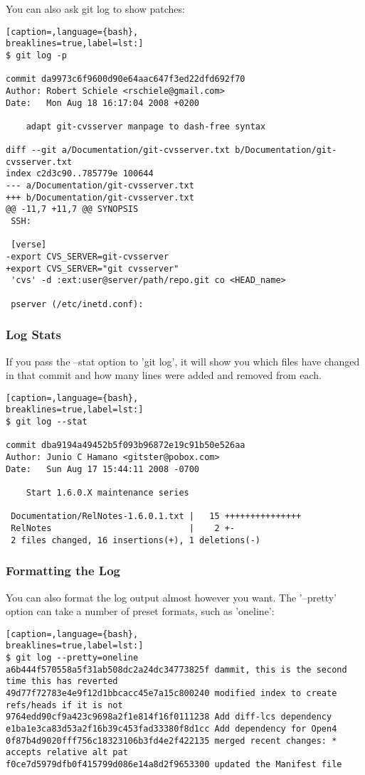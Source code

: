 You can also ask git log to show patches:
\lstset{basicstyle=\scriptsize, numbers=none, captionpos=b, tabsize=4}
\begin{lstlisting}[caption=,language={bash},
breaklines=true,label=lst:]
$ git log -p

commit da9973c6f9600d90e64aac647f3ed22dfd692f70
Author: Robert Schiele <rschiele@gmail.com>
Date:   Mon Aug 18 16:17:04 2008 +0200

    adapt git-cvsserver manpage to dash-free syntax

diff --git a/Documentation/git-cvsserver.txt b/Documentation/git-cvsserver.txt
index c2d3c90..785779e 100644
--- a/Documentation/git-cvsserver.txt
+++ b/Documentation/git-cvsserver.txt
@@ -11,7 +11,7 @@ SYNOPSIS
 SSH:

 [verse]
-export CVS_SERVER=git-cvsserver
+export CVS_SERVER="git cvsserver"
 'cvs' -d :ext:user@server/path/repo.git co <HEAD_name>

 pserver (/etc/inetd.conf):
\end{lstlisting}

\subsubsection{Log Stats}
If you pass the --stat option to 'git log', it will show you which files have
changed in that commit and how many lines were added and removed from each.
\lstset{basicstyle=\scriptsize, numbers=none, captionpos=b, tabsize=4}
\begin{lstlisting}[caption=,language={bash},
breaklines=true,label=lst:]
$ git log --stat

commit dba9194a49452b5f093b96872e19c91b50e526aa
Author: Junio C Hamano <gitster@pobox.com>
Date:   Sun Aug 17 15:44:11 2008 -0700

    Start 1.6.0.X maintenance series

 Documentation/RelNotes-1.6.0.1.txt |   15 +++++++++++++++
 RelNotes                           |    2 +-
 2 files changed, 16 insertions(+), 1 deletions(-)
\end{lstlisting}

\subsubsection{Formatting the Log}
You can also format the log output almost however you want. The '--pretty'
option can take a number of preset formats, such as 'oneline':
\lstset{basicstyle=\scriptsize, numbers=none, captionpos=b, tabsize=4}
\begin{lstlisting}[caption=,language={bash},
breaklines=true,label=lst:]
$ git log --pretty=oneline
a6b444f570558a5f31ab508dc2a24dc34773825f dammit, this is the second time this has reverted
49d77f72783e4e9f12d1bbcacc45e7a15c800240 modified index to create refs/heads if it is not 
9764edd90cf9a423c9698a2f1e814f16f0111238 Add diff-lcs dependency
e1ba1e3ca83d53a2f16b39c453fad33380f8d1cc Add dependency for Open4
0f87b4d9020fff756c18323106b3fd4e2f422135 merged recent changes: * accepts relative alt pat
f0ce7d5979dfb0f415799d086e14a8d2f9653300 updated the Manifest file
\end{lstlisting}

